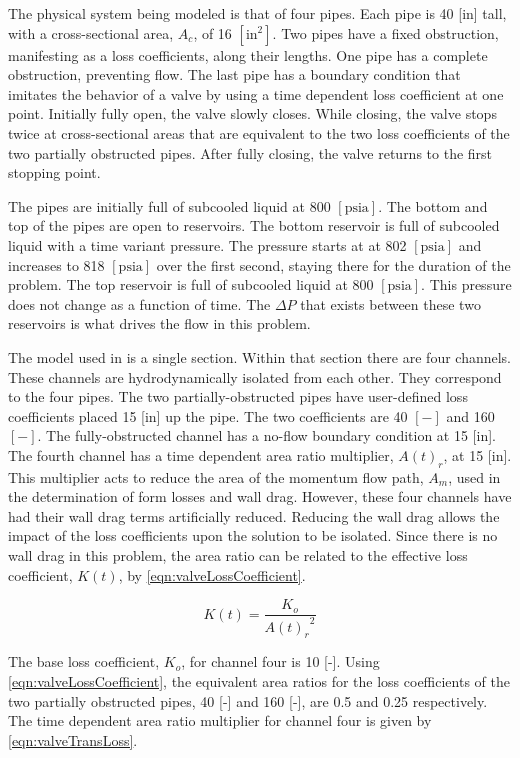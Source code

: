The physical system being modeled is that of four pipes.
Each pipe is 40 [in] tall, with a cross-sectional area, $ A_{c} $, of 16 $[\text{in}^{2}]$.
Two pipes have a fixed obstruction, manifesting as a loss coefficients, along their lengths.
One pipe has a complete obstruction, preventing flow.
The last pipe has a boundary condition that imitates the behavior of a valve by using a  time dependent loss coefficient at one point.
Initially fully open, the valve slowly closes.
While closing, the valve stops twice at cross-sectional areas that are equivalent to the two loss coefficients of the two partially obstructed pipes.
After fully closing, the valve returns to the first stopping point.

The pipes are initially full of subcooled liquid at 800 $[ \text{psia}] $.
The bottom and top of the pipes are open to reservoirs.
The bottom reservoir is full of subcooled liquid with a time variant pressure.
The pressure starts at at 802 $[ \text{psia} ] $ and increases to 818 $[ \text{psia}]$ over the first second, staying there for the duration of the problem.
The top reservoir is full of subcooled liquid at 800 $[\text{psia} ] $.
This pressure does not change as a function of time.
The $\Delta P$ that exists between these two reservoirs is what drives the flow in this problem.

The model used in \cobra{} is a single section.
Within that section there are four channels.
These channels are hydrodynamically isolated from each other.
They correspond to the four pipes.
The two partially-obstructed pipes have user-defined loss coefficients placed 15 [in] up the pipe.
The two coefficients are 40 $[-]$ and 160 $[-]$.
The fully-obstructed channel has a no-flow boundary condition at 15 [in].
The fourth channel has a time dependent area ratio multiplier, $A(t)_r$, at 15 [in].
This multiplier acts to reduce the area of the momentum flow path, $A_m$, used in the determination of form losses and wall drag.
However, these four channels have had their wall drag terms artificially reduced.
Reducing the wall drag allows the impact of the loss coefficients upon the solution to be isolated.
Since there is no wall drag in this problem, the area ratio can be related to the effective loss coefficient, $K(t)$, by \eqref{eqn:valveLossCoefficient}.

\begin{equation}
\label{eqn:valveLossCoefficient}
K(t) = \frac{K_{o}}{{A(t)_r}^2}
\end{equation}

The base loss coefficient, $K_o$, for channel four is 10 [-].
Using \eqref{eqn:valveLossCoefficient}, the equivalent area ratios for the loss coefficients of the two partially obstructed pipes, 40 [-] and 160 [-], are 0.5 and 0.25 respectively.
The time dependent area ratio multiplier for channel four is given by \eqref{eqn:valveTransLoss}.


